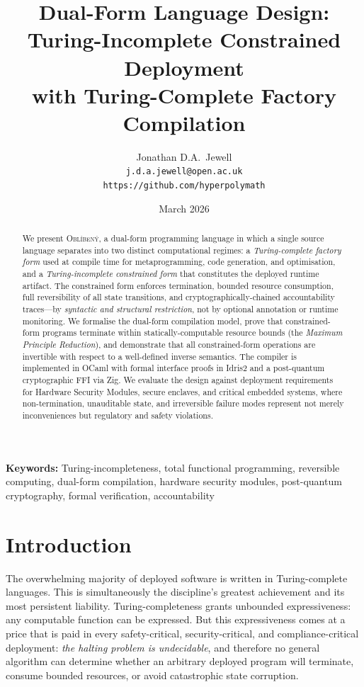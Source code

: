 \documentclass[11pt,a4paper]{article}
\title{%
  Dual-Form Language Design:\\
  Turing-Incomplete Constrained Deployment\\
  with Turing-Complete Factory Compilation%
}
\author{%
  Jonathan D.A.\ Jewell\\
  \texttt{j.d.a.jewell@open.ac.uk}\\
  \texttt{https://github.com/hyperpolymath}
}
\date{March 2026}
\newcommand{\obl}{\textsc{Obl\'{i}ben\'{y}}}
\begin{document}
\maketitle

\begin{abstract}
We present \obl{}, a dual-form programming language in which a single source
language separates into two distinct computational regimes: a
\emph{Turing-complete factory form} used at compile time for metaprogramming,
code generation, and optimisation, and a \emph{Turing-incomplete constrained
form} that constitutes the deployed runtime artifact.  The constrained form
enforces termination, bounded resource consumption, full reversibility of all
state transitions, and cryptographically-chained accountability traces---by
\emph{syntactic and structural restriction}, not by optional annotation or
runtime monitoring.  We formalise the dual-form compilation model, prove that
constrained-form programs terminate within statically-computable resource
bounds (the \emph{Maximum Principle Reduction}), and demonstrate that all
constrained-form operations are invertible with respect to a well-defined
inverse semantics.  The compiler is implemented in OCaml with formal
interface proofs in Idris2 and a post-quantum cryptographic FFI via Zig.  We
evaluate the design against deployment requirements for Hardware Security
Modules, secure enclaves, and critical embedded systems, where
non-termination, unauditable state, and irreversible failure modes represent
not merely inconveniences but regulatory and safety violations.
\end{abstract}

\medskip
\noindent\textbf{Keywords:} Turing-incompleteness, total functional programming,
reversible computing, dual-form compilation, hardware security modules,
post-quantum cryptography, formal verification, accountability

\section{Introduction}
\label{sec:introduction}

The overwhelming majority of deployed software is written in Turing-complete
languages.  This is simultaneously the discipline's greatest achievement and
its most persistent liability.  Turing-completeness grants unbounded
expressiveness: any computable function can be expressed.  But this
expressiveness comes at a price that is paid in every safety-critical,
security-critical, and compliance-critical deployment: \emph{the halting
problem is undecidable}, and therefore no general algorithm can determine
whether an arbitrary deployed program will terminate, consume bounded
resources, or avoid catastrophic state corruption.
\end{document}
